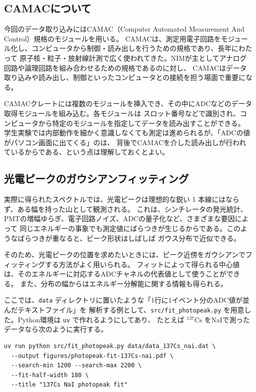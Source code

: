 \documentclass[uplatex,dvipdfmx,12pt,nomag]{jsarticle}
\begin{document}
\subsection{CAMACについて}

今回のデータ取り込みにはCAMAC（Computer Automated Measurement And Control）規格のモジュールを用いる。
CAMACは、測定用電子回路をモジュール化し、コンピュータから制御・読み出しを行うための規格であり、長年にわたって
原子核・粒子・放射線計測で広く使われてきた。NIMが主としてアナログ回路や論理回路を組み合わせるための規格であるのに対し、
CAMACはデータ取り込みや読み出し、制御といったコンピュータとの接続を担う場面で重要になる。

CAMACクレートには複数のモジュールを挿入でき、その中にADCなどのデータ取得モジュールを組み込む。各モジュールは
スロット番号などで識別され、コンピュータから特定のモジュールを指定してデータを読み出すことができる。
学生実験では内部動作を細かく意識しなくても測定は進められるが、「ADCの値がパソコン画面に出てくる」のは、
背後でCAMACを介した読み出しが行われているからである、という点は理解しておくとよい。

\subsection{光電ピークのガウシアンフィッティング}

実際に得られたスペクトルでは、光電ピークは理想的な鋭い 1 本線にはならず、ある幅を持った山として観測される。
これは、シンチレータの発光統計、PMTの増幅ゆらぎ、電子回路ノイズ、ADCの量子化など、さまざまな要因によって
同じエネルギーの事象でも測定値にばらつきが生じるからである。このようなばらつきが重なると、ピーク形状はしばしば
ガウス分布で近似できる。

そのため、光電ピークの位置を求めたいときには、ピーク近傍をガウシアンでフィッティングする方法がよく用いられる。
フィットによって得られる中心値は、そのエネルギーに対応するADCチャネルの代表値として使うことができる。
また、分布の幅からはエネルギー分解能に関する情報も得られる。

ここでは、\texttt{data} ディレクトリに置いたような「1行に1イベント分のADC値が並んだテキストファイル」を
解析する例として、\texttt{src/fit\_photopeak.py} を用意した。Python環境は \texttt{uv} で作れるようにしてあり、
たとえば $^{137}\mathrm{Cs}$ をNaIで測ったデータなら次のように実行する。

\begin{verbatim}
uv run python src/fit_photopeak.py data/data_137Cs_nai.dat \
  --output figures/photopeak-fit-137Cs-nai.pdf \
  --search-min 1200 --search-max 2200 \
  --fit-half-width 180 \
  --title "137Cs NaI photopeak fit"
\end{verbatim}
\end{document}
